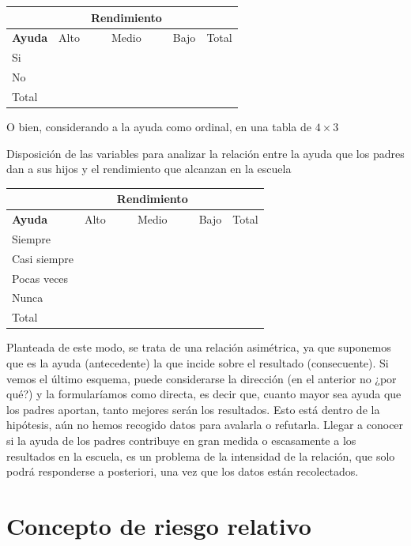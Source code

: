 \documentclass[]{book}
\begin{document}
\begin{longtable}[]{@{}llcll@{}}
\toprule
& & Rendimiento & &\tabularnewline
\midrule
\endhead
\textbf{Ayuda} & Alto & Medio & Bajo & Total\tabularnewline
Si & & & &\tabularnewline
No & & & &\tabularnewline
Total & & & &\tabularnewline
\bottomrule
\end{longtable}

O bien, considerando a la ayuda como ordinal, en una tabla de \(4 \times 3\)

Disposición de las variables para analizar la relación entre la ayuda
que los padres dan a sus hijos y el rendimiento que alcanzan en la
escuela

\begin{longtable}[]{@{}llcll@{}}
\toprule
& & Rendimiento & &\tabularnewline
\midrule
\endhead
\textbf{Ayuda} & Alto & Medio & Bajo & Total\tabularnewline
Siempre & & & &\tabularnewline
Casi siempre & & & &\tabularnewline
Pocas veces & & & &\tabularnewline
Nunca & & & &\tabularnewline
Total & & & &\tabularnewline
\bottomrule
\end{longtable}

Planteada de este modo, se trata de una relación asimétrica, ya que
suponemos que es la ayuda (antecedente) la que incide sobre el resultado
(consecuente). Si vemos el último esquema, puede considerarse la
dirección (en el anterior no ¿por qué?) y la formularíamos como directa,
es decir que, cuanto mayor sea ayuda que los padres aportan, tanto
mejores serán los resultados. Esto está dentro de la hipótesis, aún no
hemos recogido datos para avalarla o refutarla. Llegar a conocer si la
ayuda de los padres contribuye en gran medida o escasamente a los
resultados en la escuela, es un problema de la intensidad de la
relación, que solo podrá responderse a posteriori, una vez que los datos están recolectados.

\hypertarget{concepto-de-riesgo-relativo}{%
\section{Concepto de riesgo relativo}\label{concepto-de-riesgo-relativo}}
\end{document}
